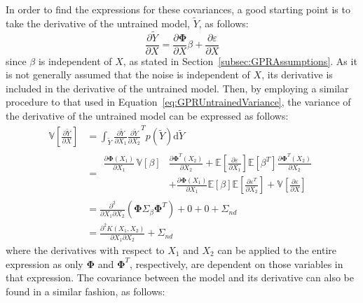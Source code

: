 \documentclass{article}
\begin{document}
In order to find the expressions for these covariances, a good starting point is to take the derivative of the untrained model, $\widetilde{Y}$, as follows:
\begin{equation}
\label{eq:UntrainedModelDerivative}
	\frac{\partial \widetilde{Y}}{\partial X} = \frac{\partial \mathbf{\Phi}}{\partial X} \beta + \frac{\partial \varepsilon}{\partial X}
\end{equation}
since $\beta$ is independent of $X$, as stated in Section~\ref{subsec:GPRAssumptions}. As it is not generally assumed that the noise is independent of $X$, its derivative is included in the derivative of the untrained model. Then, by employing a similar procedure to that used in Equation~\eqref{eq:GPRUntrainedVariance}, the variance of the derivative of the untrained model can be expressed as follows:
\begin{equation}
\label{eq:GPRUntrainedDerivativeVariance}
	\begin{aligned}
	\mathbb{V}\!\left[\frac{\partial \widetilde{Y}}{\partial X}\right] &= \int_{\widetilde{Y}} \frac{\partial \widetilde{Y}}{\partial X_1} \frac{\partial \widetilde{Y}}{\partial X_2}^T p\!\left(\widetilde{Y}\right) \text{d}\widetilde{Y} \\
	&=
	\begin{split}
	\frac{\partial \mathbf{\Phi}\!\left(X_1\right)}{\partial X_1} \, \mathbb{V}\!\left[\beta\right] &\frac{\partial \mathbf{\Phi}^T\!\left(X_2\right)}{\partial X_2} + \mathbb{E}\!\left[\frac{\partial \varepsilon}{\partial X_1}\right] \mathbb{E}\!\left[\beta^T\right] \frac{\partial \mathbf{\Phi}^T\!\left(X_2\right)}{\partial X_2} \\
	&+ \frac{\partial \mathbf{\Phi}\!\left(X_1\right)}{\partial X_1} \mathbb{E}\!\left[\beta\right] \mathbb{E}\!\left[\frac{\partial \varepsilon^T}{\partial X_2}\right] + \mathbb{V}\left[\frac{\partial \varepsilon}{\partial X}\right]
	\end{split}
	\\
	&= \frac{\partial^2}{\partial X_1 \partial X_2} \left(\mathbf{\Phi} \Sigma_\beta \mathbf{\Phi}^T\right) + 0 + 0 + \Sigma_{nd}\\
	&= \frac{\partial^2 K\!\left(X_1,X_2\right)}{\partial X_1 \partial X_2} + \Sigma_{nd}
	\end{aligned}
\end{equation}
where the derivatives with respect to $X_1$ and $X_2$ can be applied to the entire expression as only $\mathbf{\Phi}$ and $\mathbf{\Phi}^T$, respectively, are dependent on those variables in that expression. The covariance between the model and its derivative can also be found in a similar fashion, as follows:
\end{document}
